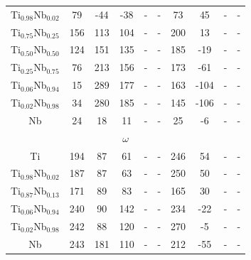 \begin{longtable}[H]{ c c c c c c c c c c }
	Ti$_{0.98}$Nb$_{0.02}$ & 79 & -44 & -38 & - & - & 73 & 45 & - & - \\
	Ti$_{0.75}$Nb$_{0.25}$ & 156 & 113 & 104 & - & - & 200 & 13 & - & - \\
	Ti$_{0.50}$Nb$_{0.50}$ & 124 & 151 & 135 & - & - & 185 & -19 & - & - \\
	Ti$_{0.25}$Nb$_{0.75}$ & 76 & 213 & 156 & - & - & 173 & -61 & - & - \\
	Ti$_{0.06}$Nb$_{0.94}$ & 15 & 289 & 177 & - & - & 163 & -104 & - & - \\
	Ti$_{0.02}$Nb$_{0.98}$ & 34 & 280 & 185 & - & - & 145 & -106 & - & - \\
	Nb & 24 & 18 & 11 & - & - & 25 & -6 & - & - \\
	\hline
	\multicolumn{10}{c}{$\omega$}\\
	Ti & 194 & 87 & 61 & - & - & 246 & 54 & - & - \\
	Ti$_{0.98}$Nb$_{0.02}$ & 187 & 87 & 63 & - & - & 250 & 50 & - & - \\
	Ti$_{0.87}$Nb$_{0.13}$ & 171 & 89 & 83 & - & - & 165 & 30 & - & - \\
	Ti$_{0.06}$Nb$_{0.94}$ & 240 & 90 & 142 & - & - & 234 & -22 & - & - \\
	Ti$_{0.02}$Nb$_{0.98}$ & 242 & 88 & 120 & - & - & 270 & -5 & - & - \\
	Nb & 243 & 181 & 110 & - & - & 212 & -55 & - & - \\
\end{longtable}

